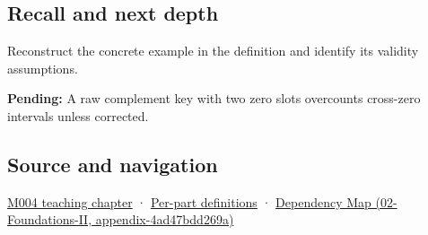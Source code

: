 \subsection{Recall and next depth}\label{appendix-deca299ae4b8-recall-and-next-depth}

Reconstruct the concrete example in the definition and identify its validity assumptions.

\textbf{Pending:} A raw complement key with two zero slots overcounts cross-zero intervals unless corrected.

\subsection{Source and navigation}\label{appendix-deca299ae4b8-source-and-navigation}

\hyperref[01-foundations-i-ch001-a-stretching-ruler-for-real-valued-quantities]{M004 teaching chapter} · \hyperref[appendix-fd090d982a15-m004---parts-61-76]{Per-part definitions} · \href{../02-Foundations-II/main.pdf\#nameddest=appendix-4ad47bdd269a}{Dependency Map (02-Foundations-II, appendix-4ad47bdd269a)}

